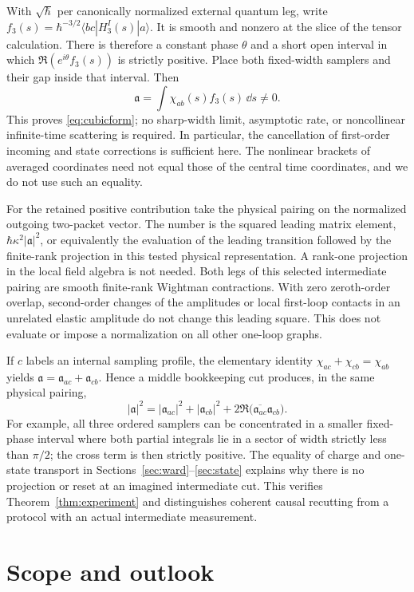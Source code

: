 With \(\sqrt{\hbar}\) per canonically normalized external quantum leg, write \(f_3(s)=\hbar^{-3/2}\langle bc|H_3^{I}(s)|a\rangle\). It is smooth and nonzero at the slice of the tensor calculation. There is therefore a constant phase \(\theta\) and a short open interval in which \(\Re(e^{i\theta}f_3(s))\) is strictly positive. Place both fixed-width samplers and their gap inside that interval. Then
\[
       \mathfrak a=\int\chi_{ab}(s)f_3(s)\,\dd s\ne0 .
\]
This proves \eqref{eq:cubicform}; no sharp-width limit, asymptotic rate, or noncollinear infinite-time scattering is required. In particular, the cancellation of first-order incoming and state corrections is sufficient here. The nonlinear brackets of averaged coordinates need not equal those of the central time coordinates, and we do not use such an equality.

For the retained positive contribution take the physical pairing on the normalized outgoing two-packet vector. The number is the squared leading matrix element, \(\hbar\kappa^2|\mathfrak a|^2\), or equivalently the evaluation of the leading transition followed by the finite-rank projection in this tested physical representation. A rank-one projection in the local field algebra is not needed. Both legs of this selected intermediate pairing are smooth finite-rank Wightman contractions. With zero zeroth-order overlap, second-order changes of the amplitudes or local first-loop contacts in an unrelated elastic amplitude do not change this leading square. This does not evaluate or impose a normalization on all other one-loop graphs.

If \(c\) labels an internal sampling profile, the elementary identity
\(\chi_{ac}+\chi_{cb}=\chi_{ab}\) yields \(\mathfrak a=\mathfrak a_{ac}+\mathfrak a_{cb}\). Hence a middle bookkeeping cut produces, in the same physical pairing,
\[
 |\mathfrak a|^2=|\mathfrak a_{ac}|^2+|\mathfrak a_{cb}|^2+
                     2\Re\bigl(\overline{\mathfrak a_{ac}}\mathfrak a_{cb}\bigr).
\]
For example, all three ordered samplers can be concentrated in a smaller fixed-phase interval where both partial integrals lie in a sector of width strictly less than \(\pi/2\); the cross term is then strictly positive. The equality of charge and one-state transport in Sections~\ref{sec:ward}--\ref{sec:state} explains why there is no projection or reset at an imagined intermediate cut. This verifies Theorem~\ref{thm:experiment} and distinguishes coherent causal recutting from a protocol with an actual intermediate measurement.

\section{Scope and outlook}

